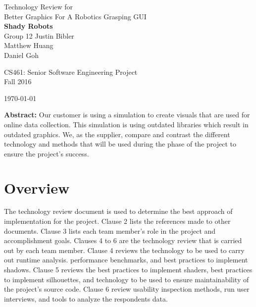 \documentclass[10pt,journal,compsoc,draftclsnofoot]{IEEEtran}
\begin{document}
\onecolumn

\begin{titlepage}
\null
\vspace{20mm}

\begin{flushleft}
\begin{bfseries}
	\vskip2mm
	\Huge{Technology Review for\\ Better Graphics For A Robotics Grasping GUI}\\
	\vspace{30mm}
	\textbf{\huge Shady Robots} \\
	\vskip2mm
	\large{Group 12}
	\vskip5mm
	\Large{Justin Bibler \\
	Matthew Huang \\
	Daniel Goh \\}
\end{bfseries}

\vspace{15mm}
\Large{CS461: Senior Software Engineering Project} \\
\Large{Fall 2016} \\

\vspace{10mm}

\today

\vfill

\begin{normalsize}
{\bf Abstract:}
Our customer is using a simulation to create visuals that are used for online data collection.
This simulation is using outdated libraries which result in outdated graphics.
We, as the supplier, compare and contrast the different technology and methods that will be used during the phase of the project to ensure the project's success.
\end{normalsize}
\end{flushleft}

\end{titlepage}



\section{Overview}
\vspace{3mm}
The technology review document is used to determine the best approach of implementation for the project. 
Clause 2 lists the references made to other documents.
Clause 3 lists each team member's role in the project and accomplishment goals.
Clauses 4 to 6 are the technology review that is carried out by each team member.
Clause 4 reviews the technology to be used to carry out runtime analysis. performance benchmarks, and best practices to implement shadows.
Clause 5 reviews the best practices to implement shaders, best practices to implement silhouettes, and technology to be used to ensure maintainability of the project's source code.
Clause 6 review usability inspection methods, run user interviews, and tools to analyze the respondents data.
\end{document}
